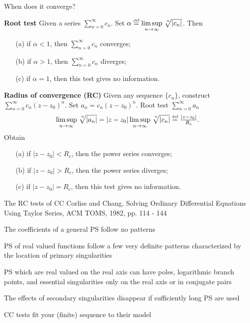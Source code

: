 \documentclass[11pt,svgnames,fleqn]{beamer}
\newcommand{\defeq}{\stackrel{\textup{\tiny def}}{=}}
\newcommand{\Setbg}[1]{\bigl\{ {#1} \bigr\}}
\newcommand{\nlimsup}[1]{\limsup\limits_{{#1} \rightarrow \infty}}
\newcommand{\proot}[2]{\sqrt[\leftroot{-3}\uproot{3}{#1}]{#2}}
\newcommand{\NC}[1]{{\color{red}#1}}
\newcommand{\DM}[1]{\begin{displaymath} {#1} \end{displaymath}}
\begin{document}
\begin{frame}{When does it converge?}

  {\bf Root test}
Given a series $\sum_{n=0}^{\infty} c_n$. Set $\alpha \defeq \nlimsup{n} \proot{n}{|c_n|}$. Then
  \begin{itemize}
    \item[(a)] if $\alpha < 1$, then $\sum_{n=0}^{\infty} c_n$ converges;
    \item[(b)] if $\alpha > 1$, then $\sum_{n=0}^{\infty} c_n$ diverges;
    \item[(c)] if $\alpha = 1$, then this test gives no information.
  \end{itemize}

\vspace{2mm}

  {\bf Radius of convergence (RC)}
  \NC{Given any sequence $\Setbg{c_n}$}, construct
$\sum_{n=0}^{\infty} c_n (z-z_0)^n$. Set $a_n = c_n (z - z_0)^n$. Root test $\sum_{n=0}^{\infty} a_n$
\DM
{
  \nlimsup{n} \proot{n}{|a_n|} = |z-z_0| \nlimsup{n} \proot{n}{|c_n|} \defeq \tfrac{|z-z_0|}{R_c}.
}
Obtain
\begin{itemize}
  \item[(a)] if $|z-z_0| < R_c$, then the power series converges;
  \item[(b)] if $|z-z_0| > R_c$, then the power series diverges;
  \item[(c)] if $|z-z_0| = R_c$, then this test gives no information.
\end{itemize}
\end{frame}



\begin{frame}{The RC tests of CC}
{Corliss and Chang, Solving Ordinary Differential Equations 
  Using Taylor Series, ACM TOMS, 1982, pp. 114 - 144}

The coefficients of a general PS follow no patterns

\vspace{3mm}

  PS of real valued functions follow \NC{a few very definite patterns characterized by the
  location of primary singularities}

\vspace{3mm}

PS which are real valued on the real axis can have poles, logarithmic branch points, and essential singularities only on the real axis or in conjugate pairs

\vspace{3mm}

The effects of secondary singularities disappear if sufficiently long PS are used

\vspace{3mm}

  CC tests \NC{fit} your (finite) sequence to their model

\end{frame}
\end{document}
